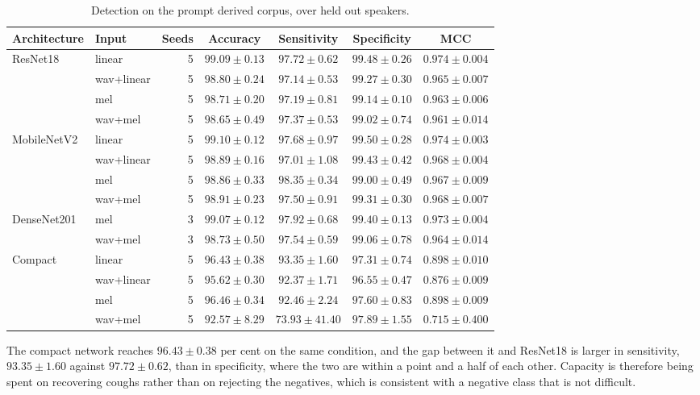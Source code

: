 \documentclass[pdflatex,sn-mathphys-num]{sn-jnl}
\begin{document}
\begin{table}[tbp]
\caption{Detection on the prompt derived corpus, over held out speakers.}\label{tab:grid}
\small
\begin{tabular}{@{}llrcccc@{}}
\toprule
Architecture & Input & Seeds & Accuracy & Sensitivity & Specificity & MCC \\
\midrule
ResNet18 & linear & 5 & $99.09 \pm 0.13$ & $97.72 \pm 0.62$ & $99.48 \pm 0.26$ & $0.974 \pm 0.004$ \\
 & wav+linear & 5 & $98.80 \pm 0.24$ & $97.14 \pm 0.53$ & $99.27 \pm 0.30$ & $0.965 \pm 0.007$ \\
 & mel & 5 & $98.71 \pm 0.20$ & $97.19 \pm 0.81$ & $99.14 \pm 0.10$ & $0.963 \pm 0.006$ \\
 & wav+mel & 5 & $98.65 \pm 0.49$ & $97.37 \pm 0.53$ & $99.02 \pm 0.74$ & $0.961 \pm 0.014$ \\
\addlinespace
MobileNetV2 & linear & 5 & $99.10 \pm 0.12$ & $97.68 \pm 0.97$ & $99.50 \pm 0.28$ & $0.974 \pm 0.003$ \\
 & wav+linear & 5 & $98.89 \pm 0.16$ & $97.01 \pm 1.08$ & $99.43 \pm 0.42$ & $0.968 \pm 0.004$ \\
 & mel & 5 & $98.86 \pm 0.33$ & $98.35 \pm 0.34$ & $99.00 \pm 0.49$ & $0.967 \pm 0.009$ \\
 & wav+mel & 5 & $98.91 \pm 0.23$ & $97.50 \pm 0.91$ & $99.31 \pm 0.30$ & $0.968 \pm 0.007$ \\
\addlinespace
DenseNet201 & mel & 3 & $99.07 \pm 0.12$ & $97.92 \pm 0.68$ & $99.40 \pm 0.13$ & $0.973 \pm 0.004$ \\
 & wav+mel & 3 & $98.73 \pm 0.50$ & $97.54 \pm 0.59$ & $99.06 \pm 0.78$ & $0.964 \pm 0.014$ \\
\addlinespace
Compact & linear & 5 & $96.43 \pm 0.38$ & $93.35 \pm 1.60$ & $97.31 \pm 0.74$ & $0.898 \pm 0.010$ \\
 & wav+linear & 5 & $95.62 \pm 0.30$ & $92.37 \pm 1.71$ & $96.55 \pm 0.47$ & $0.876 \pm 0.009$ \\
 & mel & 5 & $96.46 \pm 0.34$ & $92.46 \pm 2.24$ & $97.60 \pm 0.83$ & $0.898 \pm 0.009$ \\
 & wav+mel & 5 & $92.57 \pm 8.29$ & $73.93 \pm 41.40$ & $97.89 \pm 1.55$ & $0.715 \pm 0.400$ \\
\bottomrule
\end{tabular}
\end{table}

The compact network reaches $96.43 \pm 0.38$ per cent on the same condition, and the gap
between it and ResNet18 is larger in sensitivity, $93.35 \pm 1.60$ against
$97.72 \pm 0.62$, than in specificity, where the two are within a point and a half of each
other. Capacity is therefore being spent on recovering coughs rather than on rejecting the
negatives, which is consistent with a negative class that is not difficult.
\end{document}
